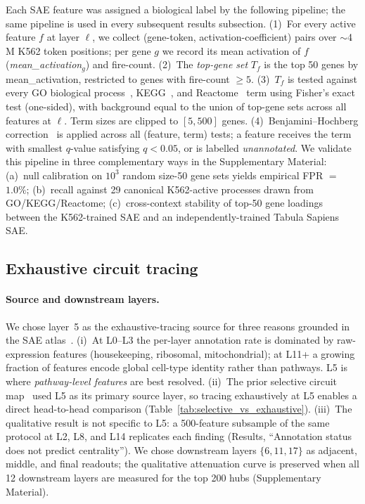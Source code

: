 \documentclass[11pt,onecolumn]{article}
\begin{document}
Each SAE feature was assigned a biological label by the following pipeline; the same pipeline is used in every subsequent results subsection.
(1)~For every active feature $f$ at layer $\ell$, we collect (gene-token, activation-coefficient) pairs over $\sim$4\,M K562 token positions; per gene $g$ we record its mean activation of $f$ (\emph{mean\_activation}$_g$) and fire-count.
(2)~The \emph{top-gene set} $T_f$ is the top 50 genes by mean\_activation, restricted to genes with fire-count $\geq 5$.
(3)~$T_f$ is tested against every GO biological process~\citep{ashburner2000go}, KEGG~\citep{kanehisa2000kegg}, and Reactome~\citep{jassal2020reactome} term using Fisher's exact test (one-sided), with background equal to the union of top-gene sets across all features at $\ell$. Term sizes are clipped to $[5, 500]$ genes.
(4)~Benjamini--Hochberg correction~\citep{benjamini1995controlling} is applied across all (feature, term) tests; a feature receives the term with smallest $q$-value satisfying $q<0.05$, or is labelled \emph{unannotated}.
We validate this pipeline in three complementary ways in the Supplementary Material: (a)~null calibration on $10^3$ random size-50 gene sets yields empirical FPR $=$\,$\mathbf{1.0\%}$; (b)~recall against 29 canonical K562-active processes drawn from GO/KEGG/Reactome; (c)~cross-context stability of top-50 gene loadings between the K562-trained SAE and an independently-trained Tabula Sapiens SAE.

\subsection{Exhaustive circuit tracing}

\paragraph{Source and downstream layers.}
We chose layer~5 as the exhaustive-tracing source for three reasons grounded in the SAE atlas~\citep{kendiukhov2025sae_atlas}. (i)~At L0--L3 the per-layer annotation rate is dominated by raw-expression features (housekeeping, ribosomal, mitochondrial); at L11+ a growing fraction of features encode global cell-type identity rather than pathways. L5 is where \emph{pathway-level features} are best resolved. (ii)~The prior selective circuit map~\citep{kendiukhov2025circuits} used L5 as its primary source layer, so tracing exhaustively at L5 enables a direct head-to-head comparison (Table~\ref{tab:selective_vs_exhaustive}). (iii)~The qualitative result is not specific to L5: a 500-feature subsample of the same protocol at L2, L8, and L14 replicates each finding (Results, ``Annotation status does not predict centrality''). We chose downstream layers $\{6, 11, 17\}$ as adjacent, middle, and final readouts; the qualitative attenuation curve is preserved when all 12 downstream layers are measured for the top 200 hubs (Supplementary Material).
\end{document}
